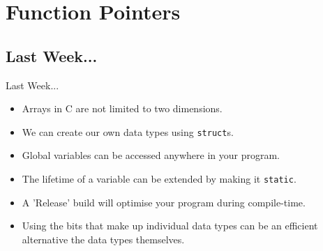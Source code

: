 \documentclass[smaller,handout,table]{beamer}
\subtitle{Lecture 5 of 5}
\begin{document}
{
\begin{frame}
  \titlepage
\end{frame}
}


\section{Function Pointers}
\subsection{Last Week...}
\begin{frame}{Last Week...}
\begin{itemize}
\item Arrays in C are not limited to two dimensions.
\item We can create our own data types using \texttt{struct}s.
\item Global variables can be accessed anywhere in your program.
\item The lifetime of a variable can be extended by making it \texttt{static}.
\item A 'Release' build will optimise your program during compile-time.
\item Using the bits that make up individual data types can be an efficient alternative the data types themselves.
\end{itemize}
\end{frame}
\end{document}
